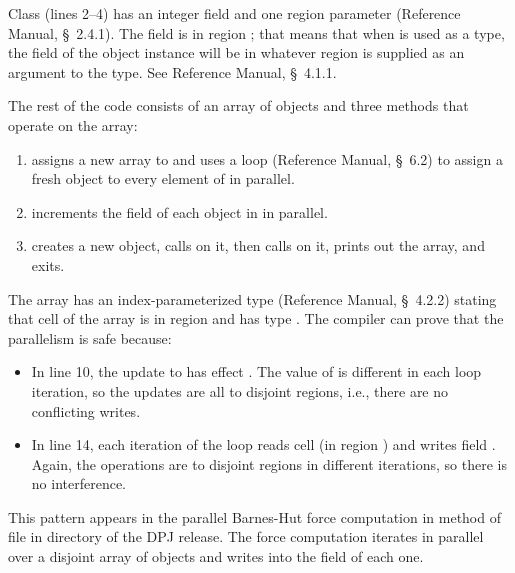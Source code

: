 Class  (lines 2--4) has an integer field  and one
region parameter  (Reference Manual, \S~2.4.1).  The field
 is in region ; that means that when  is used
as a type, the field of the object instance will be in whatever region
is supplied as an argument to the type.  See Reference Manual,
\S~4.1.1.

The rest of the code consists of an array  of 
objects and three methods that operate on the array:
%
\begin{enumerate}
%
\item {} assigns a new array to  and uses a
   loop (Reference Manual, \S~6.2) to assign a fresh
   object to every element of  in parallel.
%
\item {} increments the  field of each 
  object in  in parallel.
%
\item {} creates a new  object, calls
   on it, then calls  on it, prints out
  the array, and exits.
%
\end{enumerate}
%
The array  has an index-parameterized type (Reference Manual,
\S~4.2.2) stating that cell  of the array is in region
\kwd{[i]} and has type .  The compiler can prove
that the parallelism is safe because:
%
\begin{itemize}
%
\item In line 10, the update to  has effect .  The value of  is different in each loop iteration, so
  the updates are all to disjoint regions, i.e., there are no
  conflicting writes.
%
\item In line 14, each iteration of the loop reads cell 
  (in region \kwd{[i]}) and writes field .  Again, the
  operations are to disjoint regions in different iterations, so there
  is no interference.
%
\end{itemize}

 This pattern appears in the parallel
Barnes-Hut force computation in method  of file
 in directory
 of the DPJ release.  The
force computation iterates in parallel over a disjoint array of
 objects and writes into the  field of each one.


\begin{comment}
\subsubsection{Algorithm Example:  Barnes-Hut Force Computation%
\label{sec:array:disjoint:bh}}

TODO

\begin{figure}
\begin{numbereddpjlisting}
TODO
\end{numbereddpjlisting}
\caption{Disjoint Array Update in the Barnes-Hut force computation.}
\label{fig:array:bh}
\end{figure}
\end{comment}

